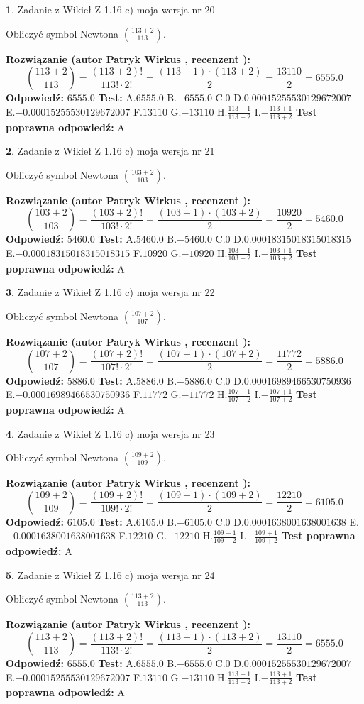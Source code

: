 \documentclass[12pt, a4paper]{article}
\theoremstyle{definition} %
\newtheorem{zad}{}
\newcommand{\zadStart}[1]{\begin{zad}#1\newline}
\newcommand{\zadStop}{\end{zad}}
\newcommand{\rozwStart}[2]{\noindent \textbf{Rozwiązanie (autor #1 , recenzent #2): }\newline}
\newcommand{\rozwStop}{\newline}
\newcommand{\odpStart}{\noindent \textbf{Odpowiedź:}\newline}
\newcommand{\odpStop}{\newline}
\newcommand{\testStart}{\noindent \textbf{Test:}\newline}
\newcommand{\testStop}{\newline}
\newcommand{\kluczStart}{\noindent \textbf{Test poprawna odpowiedź:}\newline}
\newcommand{\kluczStop}{\newline}
\begin{document}
\zadStart{Zadanie z Wikieł Z 1.16 c) moja wersja nr 20}

Obliczyć symbol Newtona ${113+2 \choose 113}$.
\zadStop
\rozwStart{Patryk Wirkus}{}
$${113+2 \choose 113} = \frac{(113+2)!}{113! \cdot 2!} = \frac{(113+1)\cdot(113+2)}{2} = \frac{13110}{2} = 6555.0$$
\rozwStop
\odpStart
$6555.0$
\odpStop
\testStart
A.$6555.0$ B.$-6555.0$ C.$0$ D.$0.00015255530129672007$ E.$-0.00015255530129672007$
F.$13110$ G.$-13110$
H.$\frac{113+1}{113+2}$
I.$-\frac{113+1}{113+2}$
\testStop
\kluczStart
A
\kluczStop



\zadStart{Zadanie z Wikieł Z 1.16 c) moja wersja nr 21}

Obliczyć symbol Newtona ${103+2 \choose 103}$.
\zadStop
\rozwStart{Patryk Wirkus}{}
$${103+2 \choose 103} = \frac{(103+2)!}{103! \cdot 2!} = \frac{(103+1)\cdot(103+2)}{2} = \frac{10920}{2} = 5460.0$$
\rozwStop
\odpStart
$5460.0$
\odpStop
\testStart
A.$5460.0$ B.$-5460.0$ C.$0$ D.$0.00018315018315018315$ E.$-0.00018315018315018315$
F.$10920$ G.$-10920$
H.$\frac{103+1}{103+2}$
I.$-\frac{103+1}{103+2}$
\testStop
\kluczStart
A
\kluczStop



\zadStart{Zadanie z Wikieł Z 1.16 c) moja wersja nr 22}

Obliczyć symbol Newtona ${107+2 \choose 107}$.
\zadStop
\rozwStart{Patryk Wirkus}{}
$${107+2 \choose 107} = \frac{(107+2)!}{107! \cdot 2!} = \frac{(107+1)\cdot(107+2)}{2} = \frac{11772}{2} = 5886.0$$
\rozwStop
\odpStart
$5886.0$
\odpStop
\testStart
A.$5886.0$ B.$-5886.0$ C.$0$ D.$0.00016989466530750936$ E.$-0.00016989466530750936$
F.$11772$ G.$-11772$
H.$\frac{107+1}{107+2}$
I.$-\frac{107+1}{107+2}$
\testStop
\kluczStart
A
\kluczStop



\zadStart{Zadanie z Wikieł Z 1.16 c) moja wersja nr 23}

Obliczyć symbol Newtona ${109+2 \choose 109}$.
\zadStop
\rozwStart{Patryk Wirkus}{}
$${109+2 \choose 109} = \frac{(109+2)!}{109! \cdot 2!} = \frac{(109+1)\cdot(109+2)}{2} = \frac{12210}{2} = 6105.0$$
\rozwStop
\odpStart
$6105.0$
\odpStop
\testStart
A.$6105.0$ B.$-6105.0$ C.$0$ D.$0.0001638001638001638$ E.$-0.0001638001638001638$
F.$12210$ G.$-12210$
H.$\frac{109+1}{109+2}$
I.$-\frac{109+1}{109+2}$
\testStop
\kluczStart
A
\kluczStop



\zadStart{Zadanie z Wikieł Z 1.16 c) moja wersja nr 24}

Obliczyć symbol Newtona ${113+2 \choose 113}$.
\zadStop
\rozwStart{Patryk Wirkus}{}
$${113+2 \choose 113} = \frac{(113+2)!}{113! \cdot 2!} = \frac{(113+1)\cdot(113+2)}{2} = \frac{13110}{2} = 6555.0$$
\rozwStop
\odpStart
$6555.0$
\odpStop
\testStart
A.$6555.0$ B.$-6555.0$ C.$0$ D.$0.00015255530129672007$ E.$-0.00015255530129672007$
F.$13110$ G.$-13110$
H.$\frac{113+1}{113+2}$
I.$-\frac{113+1}{113+2}$
\testStop
\kluczStart
A
\kluczStop
\end{document}
